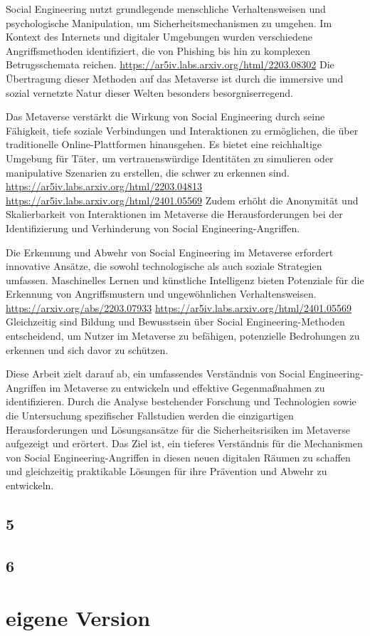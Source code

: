 Social Engineering nutzt grundlegende menschliche Verhaltensweisen und psychologische Manipulation, um Sicherheitsmechanismen zu umgehen. Im Kontext des Internets und digitaler Umgebungen wurden verschiedene Angriffsmethoden identifiziert, die von Phishing bis hin zu komplexen Betrugsschemata reichen. \url{https://ar5iv.labs.arxiv.org/html/2203.08302} Die Übertragung dieser Methoden auf das Metaverse ist durch die immersive und sozial vernetzte Natur dieser Welten besonders besorgniserregend.

Das Metaverse verstärkt die Wirkung von Social Engineering durch seine Fähigkeit, tiefe soziale Verbindungen und Interaktionen zu ermöglichen, die über traditionelle Online-Plattformen hinausgehen. Es bietet eine reichhaltige Umgebung für Täter, um vertrauenswürdige Identitäten zu simulieren oder manipulative Szenarien zu erstellen, die schwer zu erkennen sind. \url{https://ar5iv.labs.arxiv.org/html/2203.04813} \url{https://ar5iv.labs.arxiv.org/html/2401.05569} Zudem erhöht die Anonymität und Skalierbarkeit von Interaktionen im Metaverse die Herausforderungen bei der Identifizierung und Verhinderung von Social Engineering-Angriffen.

Die Erkennung und Abwehr von Social Engineering im Metaverse erfordert innovative Ansätze, die sowohl technologische als auch soziale Strategien umfassen. Maschinelles Lernen und künstliche Intelligenz bieten Potenziale für die Erkennung von Angriffsmustern und ungewöhnlichen Verhaltensweisen. \url{https://arxiv.org/abs/2203.07933} \url{https://ar5iv.labs.arxiv.org/html/2401.05569} Gleichzeitig sind Bildung und Bewusstsein über Social Engineering-Methoden entscheidend, um Nutzer im Metaverse zu befähigen, potenzielle Bedrohungen zu erkennen und sich davor zu schützen.

Diese Arbeit zielt darauf ab, ein umfassendes Verständnis von Social Engineering-Angriffen im Metaverse zu entwickeln und effektive Gegenmaßnahmen zu identifizieren. Durch die Analyse bestehender Forschung und Technologien sowie die Untersuchung spezifischer Fallstudien werden die einzigartigen Herausforderungen und Lösungsansätze für die Sicherheitsrisiken im Metaverse aufgezeigt und erörtert. Das Ziel ist, ein tieferes Verständnis für die Mechanismen von Social Engineering-Angriffen in diesen neuen digitalen Räumen zu schaffen und gleichzeitig praktikable Lösungen für ihre Prävention und Abwehr zu entwickeln.

\subsection*{5}
\subsection*{6}


\section{eigene Version}
